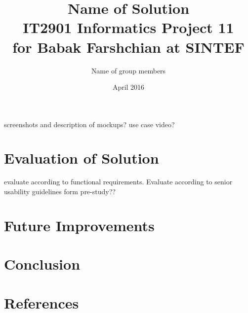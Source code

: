 \documentclass{report}
\title{Name of Solution \\
\large IT2901 Informatics Project 11 \\for Babak Farshchian at SINTEF}
\author{Name of group members }
\date{April 2016}
\begin{document}
\maketitle

\pagebreak

\tableofcontents

\pagebreak

\listoffigures
\listoftables











screenshots and description of mockups?
use case video?











\chapter{Evaluation of Solution}
evaluate according to functional requirements.
Evaluate according to senior usability guidelines form pre-study??

\chapter{Future Improvements}



\chapter{Conclusion}

\chapter{References}






\end{document}
